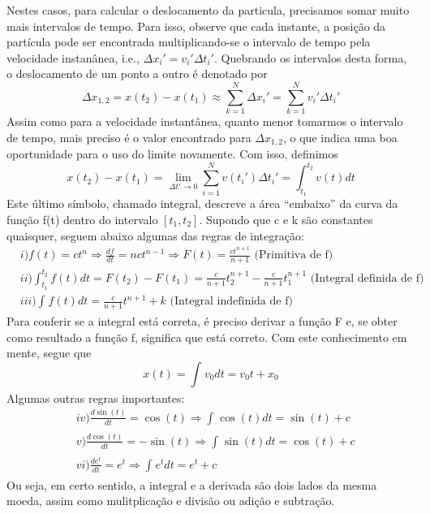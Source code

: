 \documentclass{article}
\begin{document}
Nestes casos, para calcular o deslocamento da particula, precisamos somar muito mais intervalos de tempo. Para isso, observe que
cada instante, a posi\c c\~ao da part\'icula pode ser encontrada multiplicando-se o intervalo de tempo pela velocidade instan\^anea, i.e., 
 $\Delta x_{i}' = v_{i}'\Delta t_{i}'$. Quebrando os intervalos desta forma, o deslocamento de um ponto a outro \'e denotado por
 $$
   \Delta x_{1, 2} = x(t_{2}) - x(t_{1})\approx \sum\limits_{k=1}^{N}\Delta x_{i}' = \sum\limits_{k=1}^{N}v_{i}'\Delta t_{i}'
 $$
 Assim como para a velocidade instant\^anea, quanto menor tomarmos o intervalo de tempo, mais preciso \'e o valor encontrado para $\Delta x_{1, 2}$,
o que indica uma boa oportunidade para o uso do limite novamente. Com isso, definimos
 $$
  x(t_{2}) - x(t_{1}) = \lim_{\Delta t'\to0} \sum\limits_{i=1}^{N}v(t_{i}')\Delta t_{i}' = \int_{t_{1}}^{t_{2}}v(t)dt
 $$
 Este \'ultimo s\'imbolo, chamado integral, descreve a \'area ``embaixo'' da curva da fun\c c\~ao f(t) dentro do intervalo $[t_{1}, t_{2}].$
Supondo que c e k s\~ao constantes quaisquer, seguem abaixo algumas das regras de integra\c c\~ao: 
\begin{align*}
  &i)f(t) = ct^{n} \Rightarrow \frac{df}{dt} = nct^{n-1} \Rightarrow F(t) = \frac{ct^{n+1}}{n+1}\text{ (Primitiva de f)}\\
  &ii) \int_{t_{1}}^{t_{2}}f(t)dt = F(t_{2}) - F(t_{1}) = \frac{c}{n+1}t_{2}^{n+1} - \frac{c}{n+1}t_{1}^{n+1}\text{ (Integral definida de f)}\\
  &iii) \int_{}^{}f(t)dt = \frac{c}{n+1}t^{n+1} + k\text{ (Integral indefinida de f)}
\end{align*}
  Para conferir se a integral est\'a correta, \'e preciso derivar a fun\c c\~ao F e, se obter como resultado a fun\c c\~ao f, significa que est\'a correto.
Com este conhecimento em mente, segue que 
  $$
  \boxed{ x(t) = \int_{}^{}v_{0}dt = v_{0}t + x_{0}}
  $$
  Algumas outras regras importantes:
 \begin{align*}
   &iv) \frac{d\sin{(t)}}{dt} = \cos{(t)} \Rightarrow \int_{}^{}\cos{(t)}dt = \sin{(t)} + c\\
   &v) \frac{d\cos{(t)}}{dt} = -\sin{(t)} \Rightarrow \int_{}^{}\sin{(t)}dt = \cos{(t)} + c\\
   &vi) \frac{d e^{t}}{dt} = e^{t} \Rightarrow \int_{}^{} e^{t}dt = e^{t} + c
 \end{align*}
  Ou seja, em certo sentido, a integral e a derivada s\~ao dois lados da mesma moeda, assim como mulitplica\c c\~ao e divis\~ao ou adi\c c\~ao e subtra\c c\~ao.
  \newpage
\end{document}
